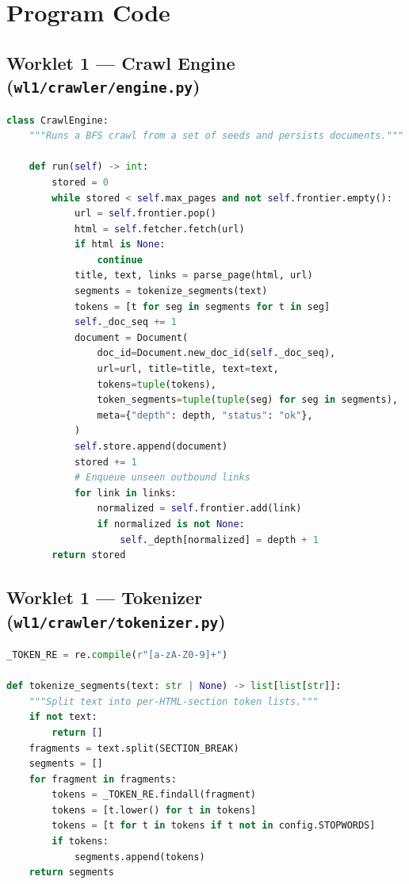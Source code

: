 \documentclass[12pt]{article}
\begin{document}
\section*{Program Code}

\subsection*{Worklet 1 --- Crawl Engine (\texttt{wl1/crawler/engine.py})}
\begin{lstlisting}[style=darkcode, language=Python, caption=BFS Crawl Engine]
class CrawlEngine:
    """Runs a BFS crawl from a set of seeds and persists documents."""

    def run(self) -> int:
        stored = 0
        while stored < self.max_pages and not self.frontier.empty():
            url = self.frontier.pop()
            html = self.fetcher.fetch(url)
            if html is None:
                continue
            title, text, links = parse_page(html, url)
            segments = tokenize_segments(text)
            tokens = [t for seg in segments for t in seg]
            self._doc_seq += 1
            document = Document(
                doc_id=Document.new_doc_id(self._doc_seq),
                url=url, title=title, text=text,
                tokens=tuple(tokens),
                token_segments=tuple(tuple(seg) for seg in segments),
                meta={"depth": depth, "status": "ok"},
            )
            self.store.append(document)
            stored += 1
            # Enqueue unseen outbound links
            for link in links:
                normalized = self.frontier.add(link)
                if normalized is not None:
                    self._depth[normalized] = depth + 1
        return stored
\end{lstlisting}

\subsection*{Worklet 1 --- Tokenizer (\texttt{wl1/crawler/tokenizer.py})}
\begin{lstlisting}[style=darkcode, language=Python, caption=Tokenization Pipeline]
_TOKEN_RE = re.compile(r"[a-zA-Z0-9]+")

def tokenize_segments(text: str | None) -> list[list[str]]:
    """Split text into per-HTML-section token lists."""
    if not text:
        return []
    fragments = text.split(SECTION_BREAK)
    segments = []
    for fragment in fragments:
        tokens = _TOKEN_RE.findall(fragment)
        tokens = [t.lower() for t in tokens]
        tokens = [t for t in tokens if t not in config.STOPWORDS]
        if tokens:
            segments.append(tokens)
    return segments
\end{lstlisting}
\end{document}
